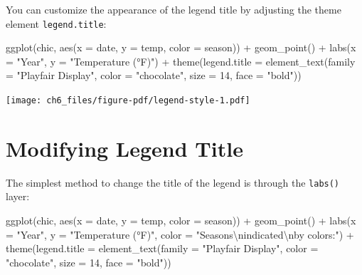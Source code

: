 \documentclass[
  letterpaper,
]{scrbook}
\newenvironment{Shaded}{\begin{snugshade}}{\end{snugshade}}
\newcommand{\AttributeTok}[1]{\textcolor[rgb]{0.40,0.45,0.13}{#1}}
\newcommand{\DecValTok}[1]{\textcolor[rgb]{0.68,0.00,0.00}{#1}}
\newcommand{\FunctionTok}[1]{\textcolor[rgb]{0.28,0.35,0.67}{#1}}
\newcommand{\NormalTok}[1]{\textcolor[rgb]{0.00,0.23,0.31}{#1}}
\newcommand{\SpecialCharTok}[1]{\textcolor[rgb]{0.37,0.37,0.37}{#1}}
\newcommand{\StringTok}[1]{\textcolor[rgb]{0.13,0.47,0.30}{#1}}
\begin{document}
You can customize the appearance of the legend title by adjusting the
theme element \texttt{legend.title}:

\begin{Shaded}
\begin{Highlighting}[]
\FunctionTok{ggplot}\NormalTok{(chic, }\FunctionTok{aes}\NormalTok{(}\AttributeTok{x =}\NormalTok{ date, }\AttributeTok{y =}\NormalTok{ temp, }\AttributeTok{color =}\NormalTok{ season)) }\SpecialCharTok{+}
  \FunctionTok{geom\_point}\NormalTok{() }\SpecialCharTok{+}
  \FunctionTok{labs}\NormalTok{(}\AttributeTok{x =} \StringTok{"Year"}\NormalTok{, }\AttributeTok{y =} \StringTok{"Temperature (°F)"}\NormalTok{) }\SpecialCharTok{+}
  \FunctionTok{theme}\NormalTok{(}\AttributeTok{legend.title =} \FunctionTok{element\_text}\NormalTok{(}\AttributeTok{family =} \StringTok{"Playfair Display"}\NormalTok{,}
                                    \AttributeTok{color =} \StringTok{"chocolate"}\NormalTok{,}
                                    \AttributeTok{size =} \DecValTok{14}\NormalTok{, }\AttributeTok{face =} \StringTok{"bold"}\NormalTok{))}
\end{Highlighting}
\end{Shaded}

\texttt{[image: ch6\_files/figure-pdf/legend-style-1.pdf]}

\section{Modifying Legend Title}\label{modifying-legend-title}

The simplest method to change the title of the legend is through the
\texttt{labs()} layer:

\begin{Shaded}
\begin{Highlighting}[]
\FunctionTok{ggplot}\NormalTok{(chic, }\FunctionTok{aes}\NormalTok{(}\AttributeTok{x =}\NormalTok{ date, }\AttributeTok{y =}\NormalTok{ temp, }\AttributeTok{color =}\NormalTok{ season)) }\SpecialCharTok{+}
  \FunctionTok{geom\_point}\NormalTok{() }\SpecialCharTok{+}
  \FunctionTok{labs}\NormalTok{(}\AttributeTok{x =} \StringTok{"Year"}\NormalTok{, }\AttributeTok{y =} \StringTok{"Temperature (°F)"}\NormalTok{,}
       \AttributeTok{color =} \StringTok{"Seasons}\SpecialCharTok{\textbackslash{}n}\StringTok{indicated}\SpecialCharTok{\textbackslash{}n}\StringTok{by colors:"}\NormalTok{) }\SpecialCharTok{+}
  \FunctionTok{theme}\NormalTok{(}\AttributeTok{legend.title =} \FunctionTok{element\_text}\NormalTok{(}\AttributeTok{family =} \StringTok{"Playfair Display"}\NormalTok{,}
                                    \AttributeTok{color =} \StringTok{"chocolate"}\NormalTok{,}
                                    \AttributeTok{size =} \DecValTok{14}\NormalTok{, }\AttributeTok{face =} \StringTok{"bold"}\NormalTok{))}
\end{Highlighting}
\end{Shaded}
\end{document}
